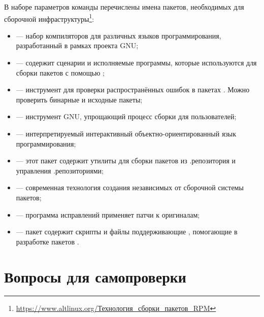 

В наборе параметров команды  перечислены имена пакетов, необходимых для сборочной 
инфраструктуры\footnote{\href{https://www.altlinux.org/Технология_сборки_пакетов_RPM}{https://www.altlinux.org/Технология\_сборки\_пакетов\_RPM}}:

\begin{itemize}
	\item {} --- набор компиляторов для различных языков программирования, разработанный в рамках проекта GNU;
	\item {} --- содержит сценарии и исполняемые программы, которые используются для сборки пакетов с помощью ;
	\item {} --- инструмент для проверки распространённых ошибок в пакетах . Можно проверить бинарные и исходные пакеты;
	\item {} --- инструмент GNU, упрощающий процесс сборки для пользователей;
	\item {} --- интерпретируемый интерактивный объектно-ориентированный язык программирования;
	\item {} --- этот пакет содержит утилиты для сборки пакетов  из .репозитория и управления .репозиториями;
	\item {} --- современная технология создания независимых от сборочной системы пакетов;
	\item {} --- программа исправлений применяет патчи к оригиналам;
	\item {} --- пакет содержит скрипты и файлы поддерживающие , помогающие в разработке пакетов .
\end{itemize}

\section{Вопросы для самопроверки}

